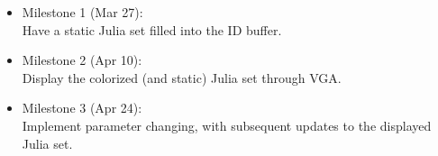 \documentclass{article}
\begin{document}
\begin{itemize}
\item Milestone 1 (Mar 27): \\
  Have a static Julia set filled into the ID buffer.
\item Milestone 2 (Apr 10): \\
  Display the colorized (and static) Julia set through VGA.
\item Milestone 3 (Apr 24): \\ 
  Implement parameter changing, with
  subsequent updates to the displayed Julia set.
\end{itemize}
\end{document}
